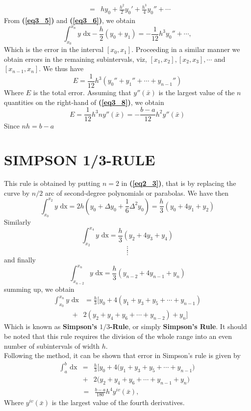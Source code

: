 \documentclass[12pt]{report}
\newcommand{\sps}{\\[0.2cm]}
\newcommand{\refn}[1]{\textbf{(\ref{#1})}}
\newcommand{\bt}[1]{\textbf{#1}}
\newcommand{\sprime}{'}
\newcommand{\dprime}{''}
\begin{document}
	\begin{eqnarray}
		&=&hy_0 + \frac{h^2}{2}y_0\sprime + \frac{h^3}{4}y_0\dprime + \cdots
		\label{eq3_6}
	\end{eqnarray} 
	From \refn{eq3_5} and \refn{eq3_6}, we obtain
	\begin{equation}
		\int_{x_0}^{x_n}y\text{ dx} - \frac{h}{2}(y_0 + y_1) = - \frac{1}{12}h^3y_0\dprime + \cdots,
		\label{eq3_7}
	\end{equation}
	Which is the error in the interval $[x_0, x_1]$.  Proceeding in a similar manner we obtain errors in the remaining subintervals, viz, $[x_1,x_2], [x_2,x_3], \cdots$ and $[x_{n-1}, x_n]$. We thus have
	\begin{equation}
		E = \frac{1}{12}h^3(y_0\dprime + y_1\dprime + \cdots + y_{n-1}\dprime)
		\label{eq3_8} 
	\end{equation}
	Where $E$ is the total error. Assuming that $y\dprime(\bar{x})$ is the largest value of the $n$ quantities on the right-hand of \refn{eq3_8}, we obtain
	\begin{equation}
		E = \frac{1}{12}h^3ny\dprime(\bar{x}) = - \frac{b-a}{12}h^2y\dprime(\bar{x})
		\label{eq3_9}
	\end{equation}
	Since $nh = b - a$
	
	\section{SIMPSON 1/3-RULE}
	This rule is obtained by putting $n=2$ in \refn{eq2_3}, that is by replacing the curve by $n/2$ arc of second-degree polynomials or parabolas. We have then
	$$
		\int_{x_0}^{x_2}y\text{ dx} = 2h(y_0 + \Delta y_0 + \frac{1}{6}\Delta^2 y_0) = \frac{h}{3}(y_0 + 4y_1 + y_2)
	$$
	Similarly
	$$
		\int_{x_2}^{x_4}y\text{ dx} = \frac{h}{3}(y_2 + 4y_3 + y_4)
	$$
	$$\vdots$$ $$\vdots$$
	and finally
	$$
		\int_{x_{n-2}}^{x_n}y\text{ dx} = \frac{h}{3}(y_{n-2} + 4y_{n-1} + y_n)
	$$
	summing up, we obtain
	\begin{eqnarray*}
		\int_{x_0}^{x_n} y\text{ dx} &= \frac{h}{3}\big[ y_0 + 4(y_1 + y_3 + y_5 + \cdots + y_{n-1})
	\end{eqnarray*}
	\begin{eqnarray}
		& + & 2(y_2 + y_4 + y_6 + \cdots + y_{n-2}) + y_n \big]
		\label{eq3_10}
	\end{eqnarray}
	Which is known as \bt{Simpson's $1/3$-Rule}, or simply \bt{Simpson's Rule}. It should be noted that this rule requires the division of the whole range into an even number of subintervals of width $h$.\sps
	Following the method, it can be shown that error in Simpson's rule is given by 
	\begin{eqnarray*}
		\int_{a}^{b}\text{ dx} &=& \frac{h}{3} \big[y_0 + 4\big(y_1 + y_3 + y_5 + \cdots + y_{n-1}\big) \\[0.4cm]
		&+& 2\big(y_2 + y_4 + y_6 + \cdots + y_{n-1} + y_n \big)
	\end{eqnarray*}
	\begin{eqnarray}
		 &=& \frac{b-a}{180} h^4 y^{iv}(\bar{x}), \; \; \; \; \; \; \; \; \; \; \; \; \; \; \; \; \quad
		 \label{eq3_11}
	\end{eqnarray}
	Where $y^{iv}(\bar{x})$ is the largest value of the fourth derivatives.
	
\end{document}
